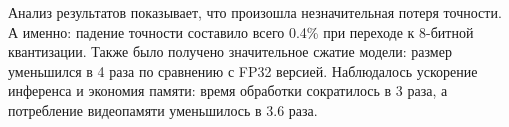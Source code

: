 \documentclass{article}
\begin{document}
Анализ результатов показывает, что произошла незначительная потеря точности. А именно: падение точности составило всего 0.4\% при переходе к 8-битной квантизации. Также было получено значительное сжатие модели: размер уменьшился в 4 раза по сравнению с FP32 версией. Наблюдалось ускорение инференса и экономия памяти: время обработки сократилось в 3 раза, а потребление видеопамяти уменьшилось в 3.6 раза.



\end{document}

